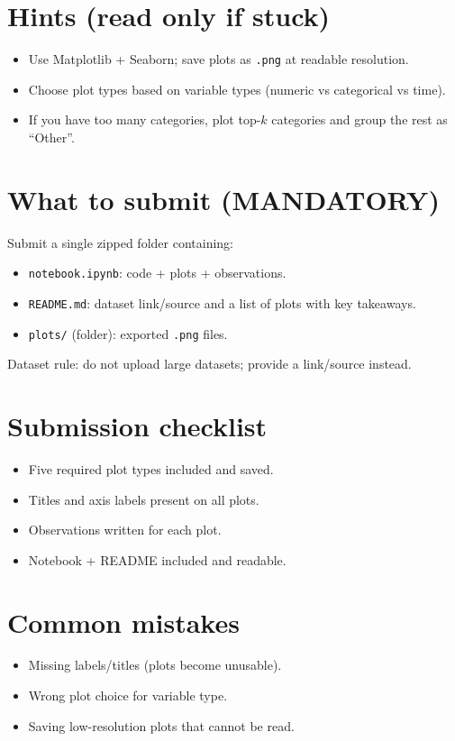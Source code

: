 \documentclass[11pt]{article}
\begin{document}
\section{Hints (read only if stuck)}
\begin{itemize}[leftmargin=*]
  \item Use Matplotlib + Seaborn; save plots as \texttt{.png} at readable resolution.
  \item Choose plot types based on variable types (numeric vs categorical vs time).
  \item If you have too many categories, plot top-$k$ categories and group the rest as ``Other''.
\end{itemize}

\section{What to submit (MANDATORY)}
Submit a single zipped folder containing:
\begin{itemize}[leftmargin=*]
  \item \texttt{notebook.ipynb}: code + plots + observations.
  \item \texttt{README.md}: dataset link/source and a list of plots with key takeaways.
  \item \texttt{plots/} (folder): exported \texttt{.png} files.
\end{itemize}
Dataset rule: do not upload large datasets; provide a link/source instead.

\section{Submission checklist}
\begin{itemize}[leftmargin=*]
  \item Five required plot types included and saved.
  \item Titles and axis labels present on all plots.
  \item Observations written for each plot.
  \item Notebook + README included and readable.
\end{itemize}

\section{Common mistakes}
\begin{itemize}[leftmargin=*]
  \item Missing labels/titles (plots become unusable).
  \item Wrong plot choice for variable type.
  \item Saving low-resolution plots that cannot be read.
\end{itemize}

\notesources{\AIMLLabSources}
\end{document}
